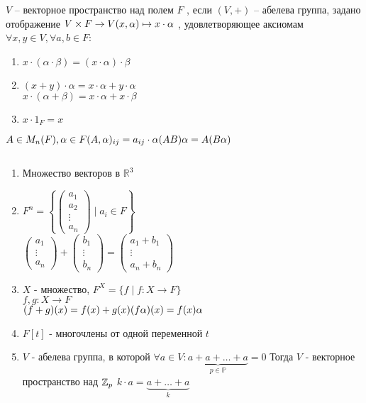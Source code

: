 \documentclass[12pt]{report}
\begin{document}
    
\begin{defn}
$V$ -- векторное пространство над полем $F$ , если $(V, +)$ -- абелева группа, задано отображение $V\times F \to V \\ (x, \alpha) \mapsto x \cdot \alpha $ , удовлетворяющее аксиомам $\forall x, y \in V, \forall a, b \in F$:
\begin{enumerate}
    \setcounter{enumi}{+4}
    \item $x \cdot (\alpha \cdot \beta) = (x \cdot \alpha) \cdot \beta$
    \item$ (x + y) \cdot \alpha = x \cdot \alpha + y \cdot \alpha$\\
     $x \cdot (\alpha + \beta) = x \cdot \alpha + x \cdot \beta$
    \item $x \cdot 1_F = x$
\end{enumerate}
\end{defn}

$A \in M_n(F), \alpha \in F \\ (A, \alpha)_{ij} = a_{ij} \cdot \alpha \\ (AB)\alpha = A(B\alpha)$
\begin{exs}$ $
\begin{enumerate}
    \item Множество векторов в $\mathbb R ^3$
    \item $F^n = \left\{ \left( 
	\begin{array}{c} a_1 \\ a_2 \\ \vdots\\ a_n \end{array} \right) \mid a_i \in F \right\}$\\
	$\left(\begin{array}{c}
	    a_1 \\ \vdots \\ a_n 
	\end{array} \right) +
	\left( \begin{array}{c}
		b_1 \\ \vdots \\ b_n
	\end{array} \right)=
	\left( \begin{array}{c}
		a_1 + b_1 \\ \vdots \\ a_n + b_n
	\end{array} \right)$
    \item $X$ - множество, $F^X = \{f \mid f:X \to F\}$ \\
	$f, g: X \to F$\\
	$(f+g)(x) = f(x) + g(x)\\ (f \alpha) (x) = f(x)\alpha$
    \item $F[t]$ - многочлены от одной переменной $t$
    \item $V$ - абелева группа, в которой $\forall a \in V: \underbrace{a + a +\ldots + a}_{p \in \mathbb P} = 0$
	Тогда $V$ - векторное пространство над $\mathbb{Z}_p$
	$k \cdot a = \underbrace{a+ \ldots +a}_{k}$
\end{enumerate}
\end{exs}
\end{document}

